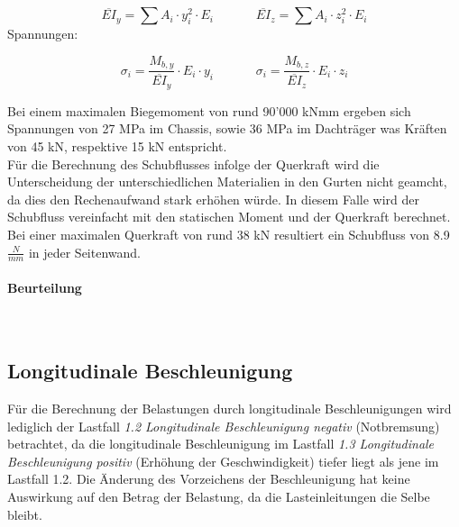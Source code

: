   \begin{equation}
    \label{eq:1}
      \overline{EI}_y = \sum A_i \cdot y_i^2 \cdot E_i \;\;\;\;\;\;\;\;\;\;\;\;  \overline{EI}_z = \sum A_i \cdot z_i^2 \cdot E_i
  \end{equation}
  Spannungen:

  \begin{equation}
    \label{eq:2}
      \sigma_i = \frac{M_{b,y}}{\overline{EI}_y}\cdot E_i \cdot y_i \;\;\;\;\;\;\;\;\;\;\;\; \sigma_i = \frac{M_{b,z}}{\overline{EI}_z}\cdot E_i \cdot z_i
  \end{equation}

  Bei einem maximalen Biegemoment von rund 90'000 kNmm ergeben sich Spannungen von 27 MPa im Chassis, sowie 36 MPa im Dachträger was Kräften von 45 kN, respektive 15 kN entspricht.\\

  Für die Berechnung des Schubflusses infolge der Querkraft wird die Unterscheidung der unterschiedlichen Materialien in den Gurten nicht geamcht, da dies den Rechenaufwand stark erhöhen würde. In diesem Falle wird der Schubfluss vereinfacht mit den statischen Moment und der Querkraft berechnet. Bei einer maximalen Querkraft von rund 38 kN resultiert ein Schubfluss von 8.9 $\frac{N}{mm}$ in jeder Seitenwand.\\

  \paragraph{Beurteilung}\mbox{}\\


\subsection{Longitudinale Beschleunigung}
\label{sub:Longitudinale Beschleunigung}
Für die Berechnung der Belastungen durch longitudinale Beschleunigungen wird lediglich der Lastfall \emph{1.2 Longitudinale Beschleunigung negativ} (Notbremsung) betrachtet, da die longitudinale Beschleunigung im Lastfall \emph{1.3 Longitudinale Beschleunigung positiv} (Erhöhung der Geschwindigkeit) tiefer liegt als jene im Lastfall 1.2. Die Änderung des Vorzeichens der Beschleunigung hat keine Auswirkung auf den Betrag der Belastung, da die Lasteinleitungen die Selbe bleibt.

